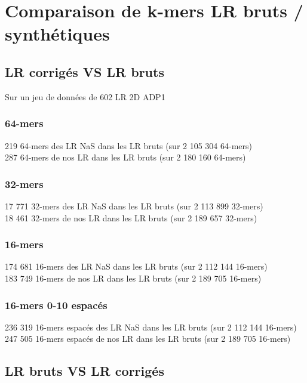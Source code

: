 \documentclass[12pt]{article}
\begin{document}
\section{Comparaison de k-mers LR bruts / synthétiques}

\subsection{LR corrigés VS LR bruts}

Sur un jeu de données de 602 LR 2D ADP1

\subsubsection{64-mers}

219 64-mers des LR NaS dans les LR bruts (sur 2 105 304 64-mers) \\

287 64-mers de nos LR dans les LR bruts (sur 2 180 160 64-mers)

\subsubsection{32-mers}

17 771 32-mers des LR NaS dans les LR bruts (sur 2 113 899 32-mers) \\

18 461 32-mers de nos LR dans les LR bruts (sur 2 189 657 32-mers)

\subsubsection{16-mers}

174 681 16-mers des LR NaS dans les LR bruts (sur 2 112 144 16-mers) \\

183 749 16-mers de nos LR dans les LR bruts (sur 2 189 705 16-mers)

\subsubsection{16-mers 0-10 espacés}

236 319 16-mers espacés des LR NaS dans les LR bruts (sur 2 112 144 16-mers) \\

247 505 16-mers espacés de nos LR dans les LR bruts (sur 2 189 705 16-mers)

\subsection{LR bruts VS LR corrigés}
\end{document}
